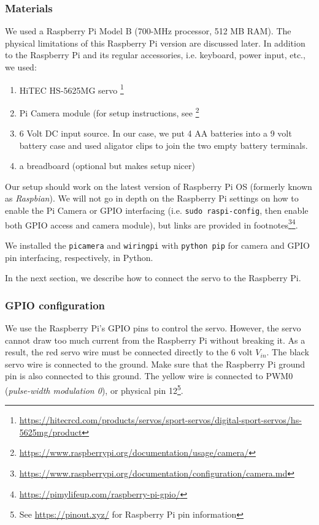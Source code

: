 \documentclass[conference, 12pt, onecolumn]{IEEEtran}
\begin{document}
\subsubsection{Materials}
We used a Raspberry Pi Model B (700-MHz processor, 512 MB RAM). The physical limitations of this Raspberry Pi version are discussed later. In addition to the Raspberry Pi and its regular accessories, i.e. keyboard, power input, etc., we used:
\begin{enumerate}
\item HiTEC HS-5625MG servo \footnote{\url{https://hitecrcd.com/products/servos/sport-servos/digital-sport-servos/hs-5625mg/product}}
\item Pi Camera module (for setup instructions, see \footnote{\url{https://www.raspberrypi.org/documentation/usage/camera/}}
\item 6 Volt DC input source. In our case, we put 4 AA batteries into a 9 volt battery case and used aligator clips to join the two empty battery terminals.
\item a breadboard (optional but makes setup nicer)
\end{enumerate}
Our setup should work on the latest version of Raspberry Pi OS (formerly known as \textit{Raspbian}). We will not go in depth on the Raspberry Pi settings on how to enable the Pi Camera or GPIO interfacing (i.e. \texttt{sudo raspi-config}, then enable both GPIO access and camera module), but links are provided in footnotes\footnote{\url{https://www.raspberrypi.org/documentation/configuration/camera.md}}\footnote{\url{https://pimylifeup.com/raspberry-pi-gpio/}}. 

We installed the \texttt{picamera} and \texttt{wiringpi} with \texttt{python pip} for camera and GPIO pin interfacing, respectively, in Python.

In the next section, we describe how to connect the servo to the Raspberry Pi.
\subsubsection{GPIO configuration}
We use the Raspberry Pi's GPIO pins to control the servo. However, the servo cannot draw too much current from the Raspberry Pi without breaking it. As a result, the red servo wire must be connected directly to the 6 volt $V_{in}$. The black servo wire is connected to the ground. Make sure that the Raspberry Pi ground pin is also connected to this ground. The yellow wire is connected to PWM0 (\textit{pulse-width modulation 0}), or physical pin 12\footnote{See \url{https://pinout.xyz/} for Raspberry Pi pin information}.
\end{document}
